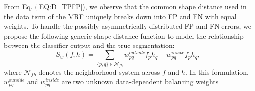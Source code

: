 \documentclass[10pt,journal,compsoc]{newIEEEtran}
\begin{document}
From Eq. (\ref{EQ:D_TPFP}), we observe that the common shape distance used in the data term of the MRF uniquely breaks down into FP and FN with equal weights. To handle the possibly asymmetrically distributed FP and FN errors, we propose the following generic shape distance function to model the relationship between the classifier output and the true segmentation:
\begin{equation}\label{EQ:SDist}
S_w(f,h) = \sum_{\{p,q\}\in\mathcal{N}_{fh}} w^{outside}_{pq}\overline{f_p}h_{q}+w^{inside}_{pq}f_p\overline{h_{q}},
\end{equation}
where $\mathcal{N}_{fh}$ denotes the neighborhood system across $f$ and $h$. In this formulation, $w^{outside}_{pq}$ and $w^{inside}_{pq}$ are two unknown data-dependent balancing weights.
\end{document}
